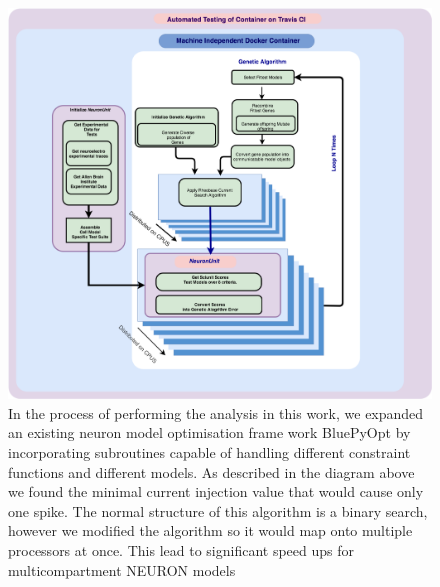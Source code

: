 \begin{figure}    
\begin{center}
\includegraphics[scale=0.5]{figures/software_architecture}
\caption{In the process of performing the analysis in this work, we expanded an existing neuron model optimisation frame work BluePyOpt \cite{bluepyopt} by incorporating subroutines capable of handling different constraint functions and different models. As described in the diagram above we found the minimal current injection value that would cause only one spike. The normal structure of this algorithm is a binary search, however we modified the algorithm so it would map onto multiple processors at once. This lead to significant speed ups for multicompartment NEURON models}

\end{center}
\end{figure}


